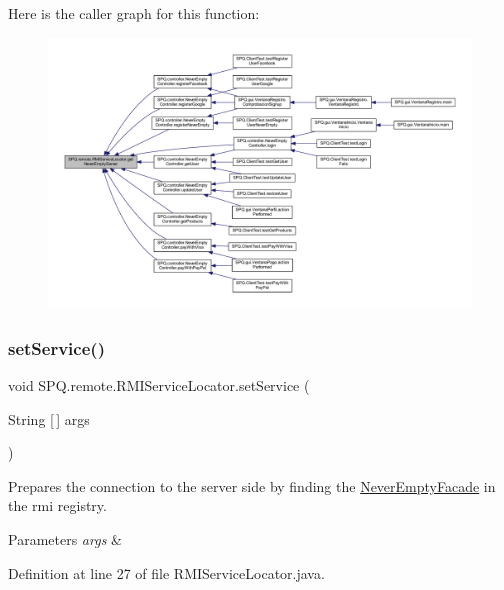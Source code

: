 Here is the caller graph for this function\+:\nopagebreak
\begin{figure}[H]
\begin{center}
\leavevmode
\includegraphics[width=350pt]{class_s_p_q_1_1remote_1_1_r_m_i_service_locator_a19d79d8b31c278a127bf921895d889ae_icgraph}
\end{center}
\end{figure}
\mbox{\label{class_s_p_q_1_1remote_1_1_r_m_i_service_locator_ae4d529073f4b435fa3d0fedcaad0fc70}} 
\subsubsection{\texorpdfstring{set\+Service()}{setService()}}
{\footnotesize\ttfamily void S\+P\+Q.\+remote.\+R\+M\+I\+Service\+Locator.\+set\+Service (\begin{DoxyParamCaption}\item[{String \mbox{[}$\,$\mbox{]}}]{args }\end{DoxyParamCaption})}

Prepares the connection to the server side by finding the \mbox{\hyperlink{class_s_p_q_1_1remote_1_1_never_empty_facade}{Never\+Empty\+Facade}} in the rmi registry. 
\begin{DoxyParams}{Parameters}
{\em args} & \\
\hline
\end{DoxyParams}


Definition at line 27 of file R\+M\+I\+Service\+Locator.\+java.

